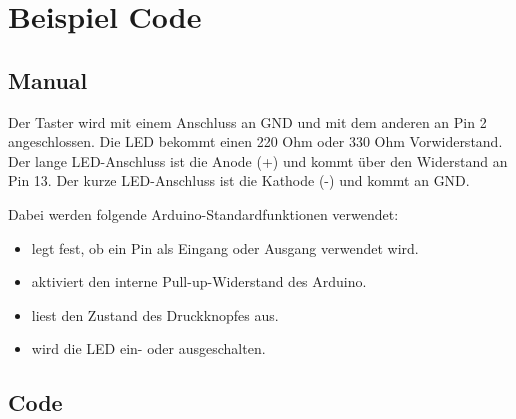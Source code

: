 


\section{Beispiel Code}

\subsection{Manual}
Der Taster wird mit einem Anschluss an GND und mit dem anderen an Pin 2 angeschlossen.
Die LED bekommt einen 220 Ohm oder 330 Ohm Vorwiderstand. Der lange LED-Anschluss ist die Anode (+) und kommt über den Widerstand an Pin 13. Der kurze LED-Anschluss ist die Kathode (-) und kommt an GND.

Dabei werden folgende Arduino-Standardfunktionen verwendet:

\begin{itemize}
\item {} legt fest, ob ein Pin als Eingang oder Ausgang verwendet wird. \cite{arduino_pinmode}
\item {} aktiviert den  interne Pull-up-Widerstand des Arduino. \cite{arduino_inputpullup}
\item {} liest den Zustand des Druckknopfes aus. \cite{arduino_digitalread}
\item {} wird die LED ein- oder ausgeschalten. \cite{arduino_digitalwrite}
\end{itemize}

\subsection{Code}
{
	\label{lst:ledmitdruckknopf}
}




